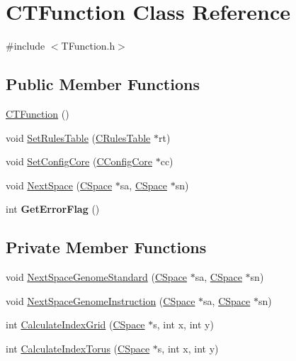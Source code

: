 \hypertarget{classCTFunction}{
\section{CTFunction Class Reference}
\label{classCTFunction}
}


{\ttfamily \#include $<$TFunction.h$>$}\subsection*{Public Member Functions}
\begin{DoxyCompactItemize}
\item 
\hyperlink{classCTFunction_a85e48f0a80f493d3e6144f3ed4058ede}{CTFunction} ()
\item 
void \hyperlink{classCTFunction_ae1ba9e9f2baff1687236edc46b23d07f}{SetRulesTable} (\hyperlink{classCRulesTable}{CRulesTable} $\ast$rt)
\item 
void \hyperlink{classCTFunction_ab629990f0e797774b7389e8bd07394a2}{SetConfigCore} (\hyperlink{classCConfigCore}{CConfigCore} $\ast$cc)
\item 
void \hyperlink{classCTFunction_a7d961dbfd8759a0e71180c4112f33ffc}{NextSpace} (\hyperlink{classCSpace}{CSpace} $\ast$sa, \hyperlink{classCSpace}{CSpace} $\ast$sn)
\item 
\hypertarget{classCTFunction_abab8543b07fa119edc0ec039ffb31d83}{
int {\bfseries GetErrorFlag} ()}
\label{classCTFunction_abab8543b07fa119edc0ec039ffb31d83}

\end{DoxyCompactItemize}
\subsection*{Private Member Functions}
\begin{DoxyCompactItemize}
\item 
void \hyperlink{classCTFunction_ac62d3fe86128f015892eccecfef0ddf8}{NextSpaceGenomeStandard} (\hyperlink{classCSpace}{CSpace} $\ast$sa, \hyperlink{classCSpace}{CSpace} $\ast$sn)
\item 
void \hyperlink{classCTFunction_a1e79617602ea9a77be8ee411daa39d6c}{NextSpaceGenomeInstruction} (\hyperlink{classCSpace}{CSpace} $\ast$sa, \hyperlink{classCSpace}{CSpace} $\ast$sn)
\item 
int \hyperlink{classCTFunction_a337b7b2bc4aa55fba6966ed732292836}{CalculateIndexGrid} (\hyperlink{classCSpace}{CSpace} $\ast$s, int x, int y)
\item 
int \hyperlink{classCTFunction_a46be389e8f79729395cb918ab58e63c0}{CalculateIndexTorus} (\hyperlink{classCSpace}{CSpace} $\ast$s, int x, int y)
\end{DoxyCompactItemize}
